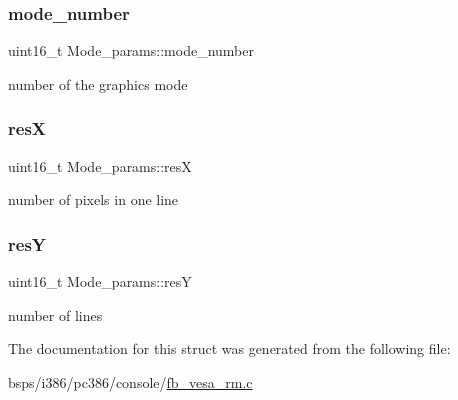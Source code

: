 \subsubsection{\texorpdfstring{mode\_number}{mode\_number}}
{\footnotesize\ttfamily uint16\+\_\+t Mode\+\_\+params\+::mode\+\_\+number}

number of the graphic\textquotesingle{}s mode \mbox{\label{structMode__params_a92630f451a6b0a91386ac35951ee29d8}} 
\subsubsection{\texorpdfstring{resX}{resX}}
{\footnotesize\ttfamily uint16\+\_\+t Mode\+\_\+params\+::resX}

number of pixels in one line \mbox{\label{structMode__params_abd4d48099c3f3504a83c4837cf1bd8ff}} 
\subsubsection{\texorpdfstring{resY}{resY}}
{\footnotesize\ttfamily uint16\+\_\+t Mode\+\_\+params\+::resY}

number of lines 

The documentation for this struct was generated from the following file\+:\begin{DoxyCompactItemize}
\item 
bsps/i386/pc386/console/\mbox{\hyperlink{fb__vesa__rm_8c}{fb\+\_\+vesa\+\_\+rm.\+c}}\end{DoxyCompactItemize}
